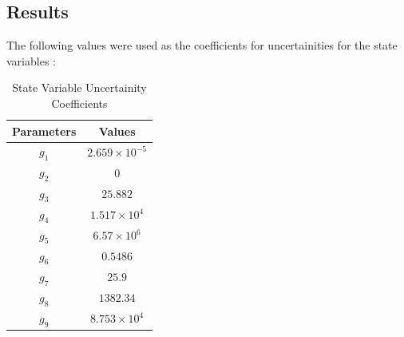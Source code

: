 \subsection{Results}
The following values were used as the coefficients for uncertainities for the state variables :
\begin{center}
\begin{table}[!h]
\centering
\begin{tabular}{|c|c|}
\hline
Parameters & Values \\
\hline
$g_{1}$ & $2.659\times10^{-5}$ \\
$g_{2}$ & $0$ \\
$g_{3}$ & $25.882$ \\
$g_{4}$ & $1.517\times10^{4}$ \\ 
$g_{5}$ & $6.57\times10^{6}$ \\
$g_{6}$ & $0.5486$ \\
$g_{7}$ & $25.9$\\
$g_{8}$ & $1382.34$ \\
$g_{9}$ & $8.753\times10^{4}$ \\
\hline
\end{tabular}
\caption{State Variable Uncertainity Coefficients\cite{yenkie}}
\label{Table2}
\end{table}
\end{center}

